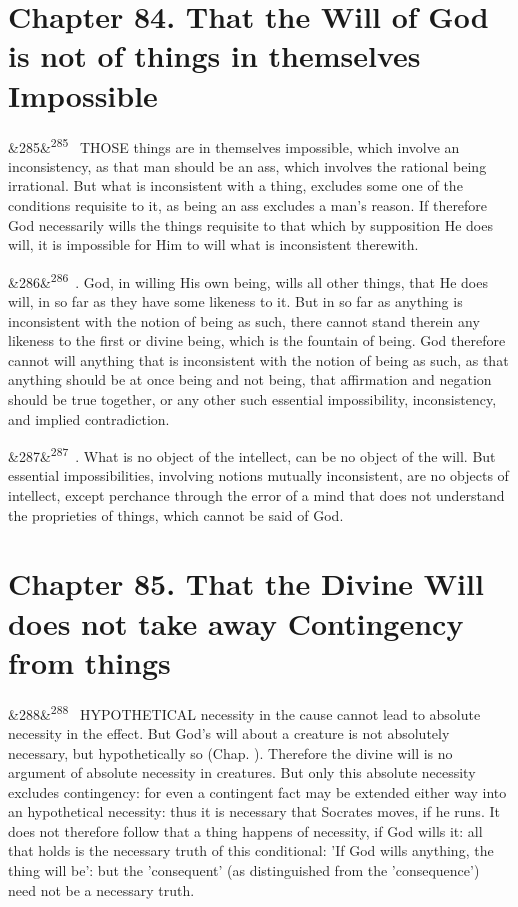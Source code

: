 \documentclass[12pt]{article}
\newcommand{\para}[1][]{\par\noindent\ifx&#1&\else\textsuperscript{\footnotesize #1}~\fi}
\begin{document}
\section*{Chapter 84. That the Will of God is not of things in themselves Impossible}

\para[285] THOSE things are in themselves impossible, which involve an inconsistency, as that man should be an ass, which involves the rational being irrational. But what is inconsistent with a thing, excludes some one of the conditions requisite to it, as being an ass excludes a man's reason. If therefore God necessarily wills the things requisite to that which by supposition He does will, it is impossible for Him to will what is inconsistent therewith.

\para[286] 2. God, in willing His own being, wills all other things, that He does will, in so far as they have some likeness to it. But in so far as anything is inconsistent with the notion of being as such, there cannot stand therein any likeness to the first or divine being, which is the fountain of being. God therefore cannot will anything that is inconsistent with the notion of being as such, as that anything should be at once being and not being, that affirmation and negation should be true together, or any other such essential impossibility, inconsistency, and implied contradiction.

\para[287] 3. What is no object of the intellect, can be no object of the will. But essential impossibilities, involving notions mutually inconsistent, are no objects of intellect, except perchance through the error of a mind that does not understand the proprieties of things, which cannot be said of God.

\section*{Chapter 85. That the Divine Will does not take away Contingency from things}

\para[288] HYPOTHETICAL necessity in the cause cannot lead to absolute necessity in the effect. But God's will about a creature is not absolutely necessary, but hypothetically so (Chap. ). Therefore the divine will is no argument of absolute necessity in creatures. But only this absolute necessity excludes contingency: for even a contingent fact may be extended either way into an hypothetical necessity: thus it is necessary that Socrates moves, if he runs. It does not therefore follow that a thing happens of necessity, if God wills it: all that holds is the necessary truth of this conditional: 'If God wills anything, the thing will be': but the 'consequent' (as distinguished from the 'consequence') need not be a necessary truth.
\end{document}
